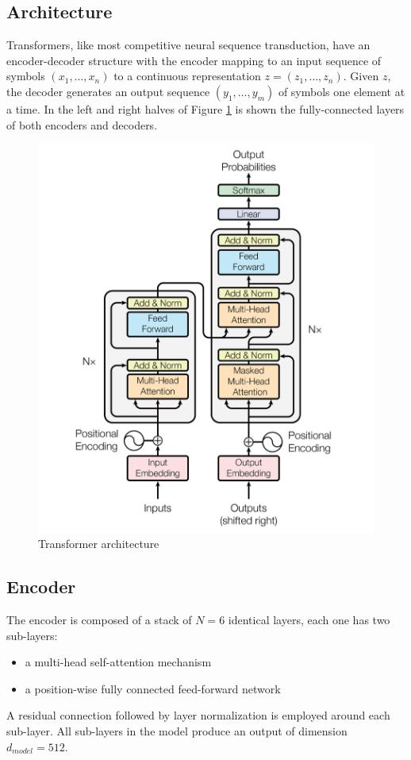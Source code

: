 \documentclass[\main/main.tex]{subfiles}
\begin{document}
\subsection{Architecture}
Transformers, like most competitive neural sequence transduction, have an encoder-decoder structure with the encoder mapping to an input sequence of symbols $(x_1, \dots, x_n)$ to a continuous representation $z = (z_1, \dots, z_n)$. Given $z$, the decoder generates an output sequence $(y_1, \dots, y_m)$ of symbols one element at a time. In the left and right halves of Figure \ref{fig:transformer_architecture} is shown the fully-connected layers of both encoders and decoders.
\begin{figure}[H]
    \centering
    \includegraphics[scale=0.35]{images/transformer/transformer_model_architecture.png}
    \caption{Transformer architecture}
    \label{fig:transformer_architecture}
\end{figure}

\subsection{Encoder}
The encoder is composed of a stack of $N=6$ identical layers, each one has two sub-layers:
\begin{itemize}
    \item a multi-head self-attention mechanism
    \item a position-wise fully connected feed-forward network
\end{itemize}
A residual connection followed by layer normalization is employed around each sub-layer. All sub-layers in the model produce an output of dimension $d_{model} = 512$.
\end{document}
